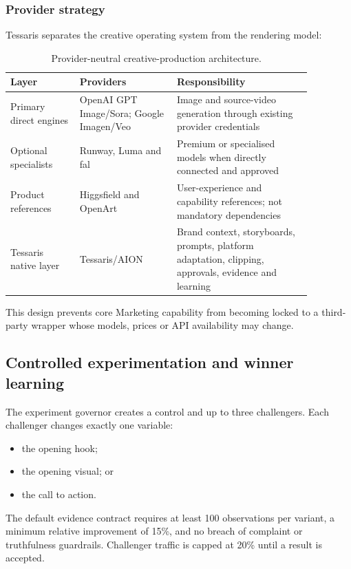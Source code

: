 \subsubsection{Provider strategy}

Tessaris separates the creative operating system from the rendering model:

\begin{table}[htbp]
\centering
\small
\begin{tabular}{p{0.20\linewidth} p{0.28\linewidth} p{0.39\linewidth}}
\toprule
\textbf{Layer} & \textbf{Providers} & \textbf{Responsibility} \\
\midrule
Primary direct engines & OpenAI GPT Image/Sora; Google Imagen/Veo & Image and source-video generation through existing provider credentials \\
Optional specialists & Runway, Luma and fal & Premium or specialised models when directly connected and approved \\
Product references & Higgsfield and OpenArt & User-experience and capability references; not mandatory dependencies \\
Tessaris native layer & Tessaris/AION & Brand context, storyboards, prompts, platform adaptation, clipping, approvals, evidence and learning \\
\bottomrule
\end{tabular}
\caption{Provider-neutral creative-production architecture.}
\end{table}

This design prevents core Marketing capability from becoming locked to a
third-party wrapper whose models, prices or API availability may change.

\subsection{Controlled experimentation and winner learning}

The experiment governor creates a control and up to three challengers. Each
challenger changes exactly one variable:

\begin{itemize}
    \item the opening hook;
    \item the opening visual; or
    \item the call to action.
\end{itemize}

The default evidence contract requires at least 100 observations per variant, a
minimum relative improvement of 15\%, and no breach of complaint or truthfulness
guardrails. Challenger traffic is capped at 20\% until a result is accepted.

